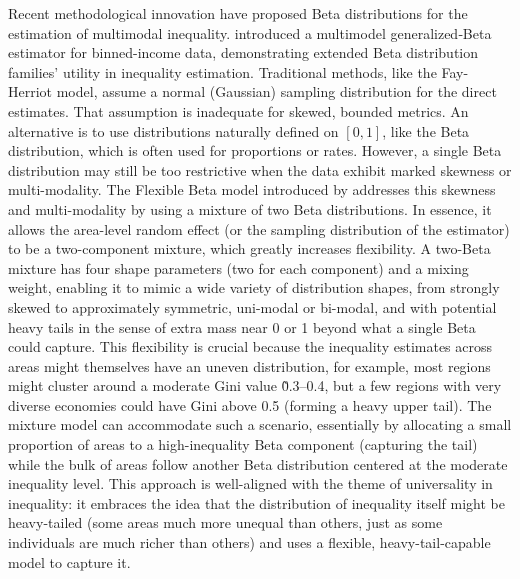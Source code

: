 \documentclass[11pt]{article}
\begin{document}
Recent methodological innovation have proposed  Beta distributions for the estimation of  multimodal inequality. \citet{von2016robust} introduced a multimodel generalized‑Beta estimator for binned-income data, demonstrating extended Beta distribution families’ utility in inequality estimation. Traditional methods, like the Fay-Herriot model, assume a normal (Gaussian) sampling distribution for the direct estimates. That assumption is inadequate for skewed, bounded metrics. An alternative is to use distributions naturally defined on \([0,1]\), like the Beta distribution, which is often used for proportions or rates. However, a single Beta distribution may still be too restrictive when the data exhibit marked skewness or multi-modality. The Flexible Beta model introduced by \citet{de2024small} addresses this skewness and multi-modality by using a mixture of two Beta distributions. In essence, it allows the area-level random effect (or the sampling distribution of the estimator) to be a two-component mixture, which greatly increases flexibility. A two-Beta mixture has four shape parameters (two for each component) and a mixing weight, enabling it to mimic a wide variety of distribution shapes, from strongly skewed to approximately symmetric, uni-modal or bi-modal, and with potential heavy tails in the sense of extra mass near 0 or 1 beyond what a single Beta could capture. This flexibility is crucial because the inequality estimates across areas might themselves have an uneven distribution, for example, most regions might cluster around a moderate Gini value \~0.3–0.4, but a few regions with very diverse economies could have Gini above 0.5 (forming a heavy upper tail). The mixture model can accommodate such a scenario, essentially by allocating a small proportion of areas to a high-inequality Beta component (capturing the tail) while the bulk of areas follow another Beta distribution centered at the moderate inequality level. This approach is well-aligned with the theme of universality in inequality: it embraces the idea that the distribution of inequality itself might be heavy-tailed (some areas much more unequal than others, just as some individuals are much richer than others) and uses a flexible, heavy-tail-capable model to capture it. 
\end{document}
